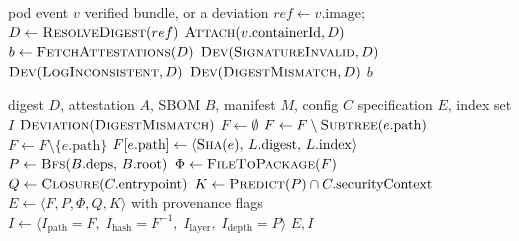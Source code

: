 \documentclass[conference]{IEEEtran}
\begin{document}
\begin{algorithm}[!t]
\footnotesize
\caption{Attestation Retrieval and Digest Check (per pod)}
\label{alg:retrieve}
\begin{algorithmic}[1]
\Require pod event $v$
\Ensure verified bundle, or a deviation
\State $ref \gets v.\text{image}$;\quad $D \gets \textsc{ResolveDigest}(ref)$
\State $\textsc{Attach}(v.\text{containerId}, D)$
  \State \Return {}
\EndIf
\State $b \gets \textsc{FetchAttestations}(D)$
  \State \Return $\textsc{Dev}(\textsc{SignatureInvalid}, D)$
\EndIf
{}
  \State \Return $\textsc{Dev}(\textsc{LogInconsistent}, D)$
\EndIf
{}
  \State \Return $\textsc{Dev}(\textsc{DigestMismatch}, D)$
\EndIf
\State \Return $b$ 
\end{algorithmic}
\end{algorithm}

\begin{algorithm}[!t]
\footnotesize
\caption{Envelope Compilation (per image digest)}
\label{alg:compile}
\begin{algorithmic}[1]
\Require digest $D$, attestation $A$, SBOM $B$, manifest $M$, config $C$
\Ensure specification $E$, index set $I$
  \State \Return $\textsc{Deviation}(\textsc{DigestMismatch})$
\EndIf
\State $F \gets \emptyset$
      $F \gets F \setminus \textsc{Subtree}(e.\text{path})$
      $F \gets F \setminus \{e.\text{path}\}$
    \Else
      \State $F[e.\text{path}] \gets \langle \textsc{Sha}(e),\,
              L.\text{digest},\, L.\text{index}\rangle$
    \EndIf
  \EndFor
\EndFor
\State $P \gets \textsc{Bfs}(B.\text{deps},\, B.\text{root})$
\State $\Phi \gets \textsc{FileToPackage}(F)$
\State $Q \gets \textsc{Closure}(C.\text{entrypoint})$
\State $K \gets \textsc{Predict}(P) \cap C.\text{securityContext}$
\State $E \gets \langle F,P,\Phi,Q,K\rangle$ with provenance flags
\State $I \gets \langle
  I_{\text{path}}{=}F,\;
  I_{\text{hash}}{=}F^{-1},\;
  I_{\text{layer}},\;
  I_{\text{depth}}{=}P \rangle$
\State \Return $E, I$
\end{algorithmic}
\end{algorithm}
\end{document}
